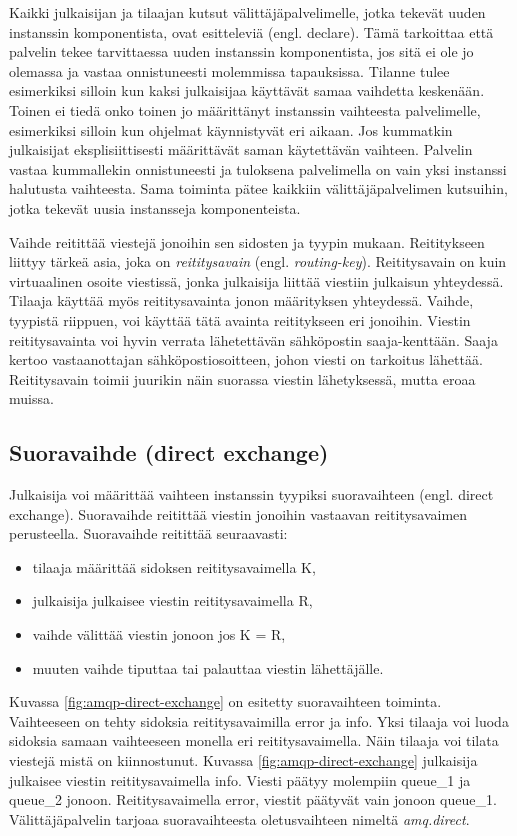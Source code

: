 Kaikki julkaisijan ja tilaajan kutsut välittäjäpalvelimelle, jotka tekevät uuden instanssin komponentista, ovat esitteleviä (engl. declare). Tämä tarkoittaa että palvelin tekee tarvittaessa uuden instanssin komponentista, jos sitä ei ole jo olemassa ja vastaa onnistuneesti molemmissa tapauksissa. Tilanne tulee esimerkiksi silloin kun kaksi julkaisijaa käyttävät samaa vaihdetta keskenään. Toinen ei tiedä onko toinen jo määrittänyt instanssin vaihteesta palvelimelle, esimerkiksi silloin kun ohjelmat käynnistyvät eri aikaan. Jos kummatkin julkaisijat eksplisiittisesti määrittävät saman käytettävän vaihteen. Palvelin vastaa kummallekin onnistuneesti ja tuloksena palvelimella on vain yksi instanssi halutusta vaihteesta. Sama toiminta pätee kaikkiin välittäjäpalvelimen kutsuihin, jotka tekevät uusia instansseja komponenteista.

Vaihde reitittää viestejä jonoihin sen sidosten ja tyypin mukaan. Reititykseen liittyy tärkeä asia, joka on \emph{reititysavain} (engl. \emph{routing-key}). Reititysavain on kuin virtuaalinen osoite viestissä, jonka julkaisija liittää viestiin julkaisun yhteydessä. Tilaaja käyttää myös reititysavainta jonon määrityksen yhteydessä. Vaihde, tyypistä riippuen, voi käyttää tätä avainta reititykseen eri jonoihin. Viestin reititysavainta voi hyvin verrata lähetettävän sähköpostin saaja-kenttään. Saaja kertoo vastaanottajan sähköpostiosoitteen, johon viesti on tarkoitus lähettää. Reititysavain toimii juurikin näin suorassa viestin lähetyksessä, mutta eroaa muissa.


\subsection{Suoravaihde (direct exchange)}
\label{ch:direct-exchange}
Julkaisija voi määrittää vaihteen instanssin tyypiksi suoravaihteen (engl. direct exchange). Suoravaihde reitittää viestin jonoihin vastaavan reititysavaimen perusteella. Suoravaihde reitittää seuraavasti:
\begin{itemize}
	\item tilaaja määrittää sidoksen reititysavaimella K,
	\item julkaisija julkaisee viestin reititysavaimella R,
	\item vaihde välittää viestin jonoon jos K = R,
	\item muuten vaihde tiputtaa tai palauttaa viestin lähettäjälle.
\end{itemize}
Kuvassa \ref{fig:amqp-direct-exchange} on esitetty suoravaihteen toiminta. Vaihteeseen on tehty sidoksia reititysavaimilla error ja info. Yksi tilaaja voi luoda sidoksia samaan vaihteeseen monella eri reititysavaimella. Näin tilaaja voi tilata viestejä mistä on kiinnostunut. Kuvassa \ref{fig:amqp-direct-exchange} julkaisija julkaisee viestin reititysavaimella info. Viesti päätyy molempiin queue\_1 ja queue\_2 jonoon. Reititysavaimella error, viestit päätyvät vain jonoon queue\_1. Välittäjäpalvelin tarjoaa suoravaihteesta oletusvaihteen nimeltä \emph{amq.direct}. \mbox{\cite[s.~27]{AMQP-specification}}

